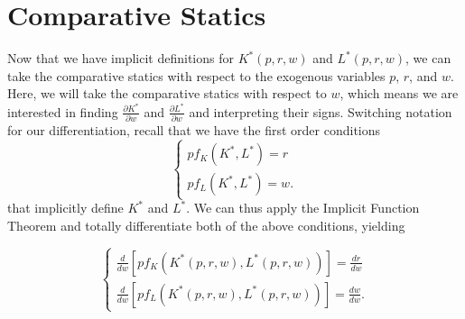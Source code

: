 \section{Comparative Statics}

Now that we have implicit definitions for $K^*(p, r, w)$ and $L^*(p, r, w)$, we can take the comparative statics with respect to the exogenous variables $p$, $r$, and $w$. Here, we will take the comparative statics with respect to $w$, which means we are interested in finding $\frac{\partial K^*}{\partial w}$ and $\frac{\partial L^*}{\partial w}$ and interpreting their signs. Switching notation for our differentiation, recall that we have the first order conditions
$$\begin{cases}
p f_K\left(K^{*}, L^{*}\right) = r \\
p f_L\left(K^{*}, L^{*}\right) = w.
\end{cases}$$
that implicitly define $K^*$ and $L^*$. We can thus apply the Implicit Function Theorem and totally differentiate both of the above conditions, yielding

$$\begin{cases}
\frac{d}{d w}\left[p f_{K}\left(K^{*}(p, r, w), L^{*}(p, r, w)\right)\right]=\frac{d r}{d w} \\
\frac{d}{d w}\left[p f_{L}\left(K^{*}(p, r, w), L^{*}(p, r, w)\right)\right]=\frac{d w}{d w}.
\end{cases}$$

